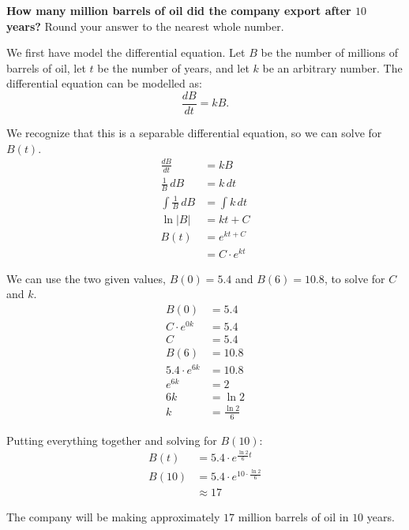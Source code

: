 \documentclass[12pt]{article}
\begin{document}
\begin{enumerate}
                \noindent \textbf{How many million barrels of oil did the company export after $10$ years?} Round your answer to the nearest whole number.

                \vspace{6mm}

                We first have model the differential equation. Let $B$ be the number of millions of barrels of oil, let $t$ be the number of years, and let $k$ be an arbitrary number. The differential equation can be modelled as:
                \[ \frac{dB}{dt} = kB. \]

                We recognize that this is a separable differential equation, so we can solve for $B(t)$.
                \begin{align*}
                    \frac{dB}{dt} &= kB \\[6pt]
                    \frac{1}{B} \, dB &= k \, dt \\[6pt]
                    \int \frac{1}{B} \, dB &= \int k \, dt \\[6pt]
                    \ln|B| &= kt + C \\
                    B(t) &= e^{kt + C} \\
                    &= C \cdot e^{kt}
                \end{align*}

                We can use the two given values, $B(0) = 5.4$ and $B(6) = 10.8$, to solve for $C$ and $k$.
                \begin{align*}
                    B(0) &= 5.4 \\
                    C \cdot e^{0k} &= 5.4 \\
                    C &= 5.4 \\[10pt]
                    B(6) &= 10.8 \\
                    5.4 \cdot e^{6k} &= 10.8 \\
                    e^{6k} &= 2 \\
                    6k &= \ln 2 \\
                    k &= \frac{\ln 2}{6}
                \end{align*}

                Putting everything together and solving for $B(10)$:
                \begin{align*}
                    B(t) &= 5.4 \cdot e^{\frac{\ln 2}{6} t} \\
                    B(10) &= 5.4 \cdot e^{10 \cdot \frac{\ln 2}{6}} \\
                    &\approx 17
                \end{align*}

                The company will be making approximately $17$ million barrels of oil in $10$ years.
            \end{enumerate}
\end{document}
